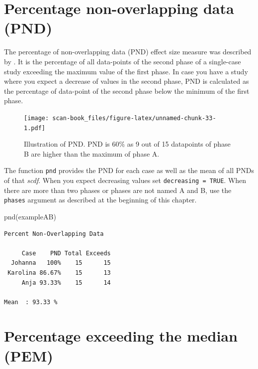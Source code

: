 \documentclass[
]{book}
\newenvironment{Shaded}{\begin{snugshade}}{\end{snugshade}}
\newcommand{\FunctionTok}[1]{\textcolor[rgb]{0.00,0.00,0.00}{#1}}
\newcommand{\NormalTok}[1]{#1}
\begin{document}
\hypertarget{percentage-non-overlapping-data-pnd}{%
\section{Percentage non-overlapping data (PND)}\label{percentage-non-overlapping-data-pnd}}

The percentage of non-overlapping data (PND) effect size measure was described by \citet{scruggs_quantitative_1987} . It is the percentage of all data-points of the second phase of a single-case study exceeding the maximum value of the first phase. In case you have a study where you expect a decrease of values in the second phase, PND is calculated as the percentage of data-point of the second phase below the minimum of the first phase.

\begin{figure}
\centering
\texttt{[image: scan-book\_files/figure-latex/unnamed-chunk-33-1.pdf]}
\caption{\label{fig:unnamed-chunk-33}Illustration of PND. PND is 60\% as 9 out of 15 datapoints of phase B are higher than the maximum of phase A.}
\end{figure}

The function \texttt{pnd} provides the PND for each case as well as the mean of all PNDs of that \emph{scdf}. When you expect decreasing values set \texttt{decreasing\ =\ TRUE}. When there are more than two phases or phases are not named A and B, use the \texttt{phases} argument as described at the beginning of this chapter.

\begin{Shaded}
\begin{Highlighting}[]
\FunctionTok{pnd}\NormalTok{(exampleAB)}
\end{Highlighting}
\end{Shaded}

\begin{verbatim}
Percent Non-Overlapping Data

     Case    PND Total Exceeds
  Johanna   100%    15      15
 Karolina 86.67%    15      13
     Anja 93.33%    15      14

Mean  : 93.33 %
\end{verbatim}

\hypertarget{percentage-exceeding-the-median-pem}{%
\section{Percentage exceeding the median (PEM)}\label{percentage-exceeding-the-median-pem}}
\end{document}
